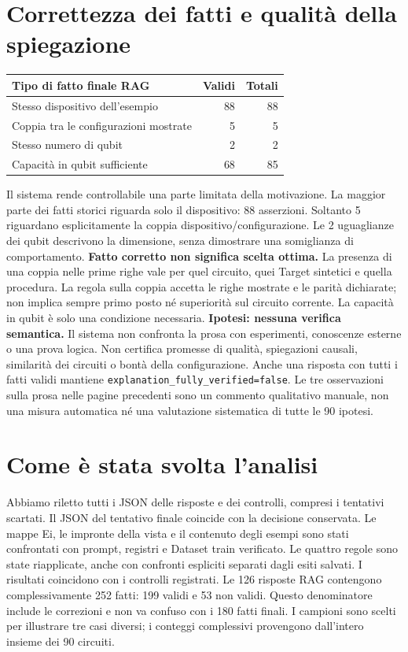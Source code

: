 \documentclass[a4paper,10pt]{article}
\begin{document}
\section*{Correttezza dei fatti e qualità della spiegazione}
\begin{tabularx}{\linewidth}{Xrr}\toprule Tipo di fatto finale RAG & Validi & Totali\\\midrule
Stesso dispositivo dell'esempio & 88 & 88\\
Coppia tra le configurazioni mostrate & 5 & 5\\
Stesso numero di qubit & 2 & 2\\
Capacità in qubit sufficiente & 68 & 85\\
\bottomrule\end{tabularx}
Il sistema rende controllabile una parte limitata della motivazione. La maggior parte dei fatti storici riguarda solo il dispositivo: 88 asserzioni. Soltanto 5 riguardano esplicitamente la coppia dispositivo/configurazione. Le 2 uguaglianze dei qubit descrivono la dimensione, senza dimostrare una somiglianza di comportamento.
\textbf{Fatto corretto non significa scelta ottima.} La presenza di una coppia nelle prime righe vale per quel circuito, quei Target sintetici e quella procedura. La regola sulla coppia accetta le righe mostrate e le parità dichiarate; non implica sempre primo posto né superiorità sul circuito corrente. La capacità in qubit è solo una condizione necessaria.
\textbf{Ipotesi: nessuna verifica semantica.} Il sistema non confronta la prosa con esperimenti, conoscenze esterne o una prova logica. Non certifica promesse di qualità, spiegazioni causali, similarità dei circuiti o bontà della configurazione. Anche una risposta con tutti i fatti validi mantiene \texttt{explanation\_fully\_verified=false}. Le tre osservazioni sulla prosa nelle pagine precedenti sono un commento qualitativo manuale, non una misura automatica né una valutazione sistematica di tutte le 90 ipotesi.
\section*{Come è stata svolta l'analisi}
Abbiamo riletto tutti i JSON delle risposte e dei controlli, compresi i tentativi scartati. Il JSON del tentativo finale coincide con la decisione conservata. Le mappe Ei, le impronte della vista e il contenuto degli esempi sono stati confrontati con prompt, registri e Dataset train verificato. Le quattro regole sono state riapplicate, anche con confronti espliciti separati dagli esiti salvati. I risultati coincidono con i controlli registrati.
Le 126 risposte RAG contengono complessivamente 252 fatti: 199 validi e 53 non validi. Questo denominatore include le correzioni e non va confuso con i 180 fatti finali. I campioni sono scelti per illustrare tre casi diversi; i conteggi complessivi provengono dall'intero insieme dei 90 circuiti.
\end{document}
